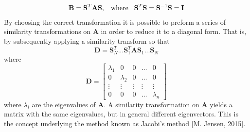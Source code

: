 \documentclass[%
reprint,
amsmath, 
amssymb, 
aps,]{revtex4-1}
\begin{document}
			\begin{equation*} \label{eq2}
\mathbf{B} = \mathbf{S}^T\mathbf{A}\mathbf{S}, \hspace{3mm} \textnormal{where} \hspace{3mm} \mathbf{S}^T\mathbf{S} = \mathbf{S}^{-1}\mathbf{S} = \mathbf{I}
			\end{equation*}
By choosing the correct transformation it is possible to preform a series of similarity transformations on $\mathbf{A}$ in order to reduce it to a diagonal form. That is, by subsequently applying a similarity transform so that 
			\begin{equation*}
\mathbf{D} = \mathbf{S}_N^T...\mathbf{S}_1^T\mathbf{A}\mathbf{S}_1...\mathbf{S}_N 
			\end{equation*}
where 
			\begin{equation*}
	\mathbf{D} = \begin{bmatrix}
	\lambda_1 & 0 & 0 & \dots & 0 \\
	0 & \lambda_2 & 0 & \dots & 0 \\
	\vdots & \vdots & \vdots &\vdots&\vdots\\
	0 & 0 & 0 &\dots & \lambda_n
	\end{bmatrix}
			\end{equation*}
where $\lambda_i$ are the eigenvalues of $\mathbf{A}$. A similarity transformation on $\mathbf{A}$ yields a matrix with the same eigenvalues, but in general different eigenvectors. This is the concept underlying the method known as Jacobi's method [M. Jensen, 2015].
\end{document}
